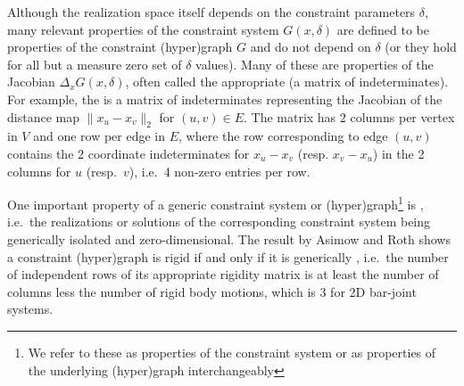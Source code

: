 Although the realization space itself depends on the constraint parameters $\delta$, many relevant  properties of the constraint system $G(x,\delta)$ are defined to be properties of the constraint (hyper)graph $G$ and do not depend on $\delta$ (or they hold for all but a measure zero set of $\delta$ values). Many of these are properties of the Jacobian $\Delta_x G(x,\delta)$, often called the appropriate  (a matrix of indeterminates). For example, the  is a matrix of indeterminates representing the Jacobian of the distance map $\| x_u -x_v \|_2$  for $(u,v) \in E$. The matrix has $2$ columns per vertex in $V$ and one row per edge in $E$, where the row corresponding to edge $(u,v)$ contains the 2 coordinate indeterminates for $x_u -x_v$ (resp. $x_v-x_u$) in the 2 columns for $u$ (resp.\ $v$), i.e.\ 4 non-zero entries per row.



One important property of a generic constraint system or (hyper)graph\footnote{We refer to these as properties of the constraint system or as properties of the underlying (hyper)graph interchangeably}
is ,
i.e.\ the realizations or solutions of the corresponding constraint system being generically isolated and zero-dimensional.
The result by Asimow and Roth \cite{asimow1978rigidity}  shows a constraint (hyper)graph is rigid if and only if  it is generically , i.e.\ the number of independent rows of its appropriate rigidity matrix is at least the number of columns less the number of rigid body motions, which is 3 for 2D bar-joint systems.


